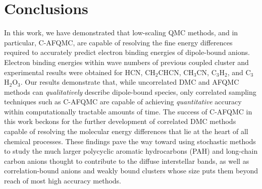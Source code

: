 \section{Conclusions}

In this work, we have demonstrated that low-scaling QMC methods, and in particular, C-AFQMC, are capable of resolving the fine energy differences required to accurately predict electron binding energies of dipole-bound anions. Electron binding energies within wave numbers of previous coupled cluster and experimental results were obtained for HCN, CH$_{2}$CHCN, CH$_{3}$CN, C$_{3}$H$_{2}$, and C$_{3}$H$_{2}$O$_{3}$. Our results demonstrate that, while uncorrelated DMC and AFQMC methods can \textit{qualitatively} describe dipole-bound species, only correlated sampling techniques such as C-AFQMC are capable of achieving \textit{quantitative} accuracy within  computationally tractable amounts of time. The success of C-AFQMC in this work beckons for the further development of correlated DMC methods capable of resolving the molecular energy differences that lie at the heart of all chemical processes. These findings pave the way toward using stochastic methods to study the much larger polycyclic aromatic hydrocarbons (PAH) \cite{Voora_JPCL_2015} and long-chain carbon anions\cite{Tulej_AJL_1998} thought to contribute to the diffuse interstellar bands, as well as correlation-bound anions\cite{Voora_Jordan_JPCL_2013,Jordan_Sommerfeld_JCP_2017} and weakly bound clusters \cite{Zen_PNAS_2017} whose size puts them beyond reach of most high accuracy methods.

